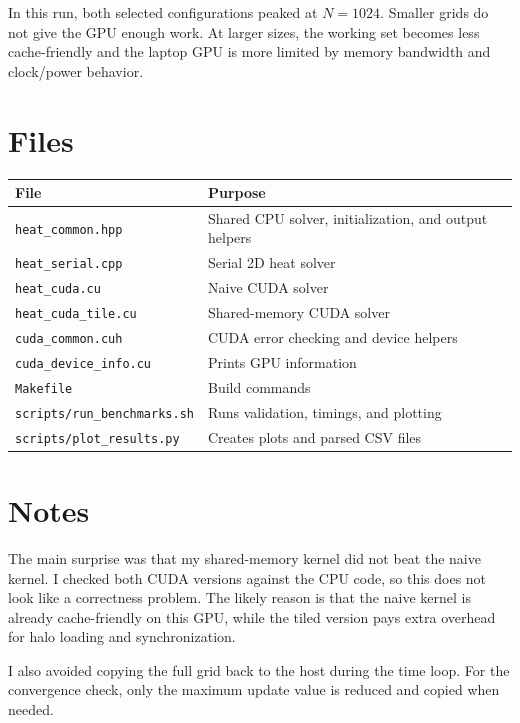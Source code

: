 \documentclass[11pt]{article}
\begin{document}
In this run, both selected configurations peaked at \(N=1024\). Smaller grids
do not give the GPU enough work. At larger sizes, the working set becomes less
cache-friendly and the laptop GPU is more limited by memory bandwidth and
clock/power behavior.

\section{Files}

\begin{center}
\begin{tabular}{ll}
\toprule
File & Purpose \\
\midrule
\texttt{heat\_common.hpp} & Shared CPU solver, initialization, and output helpers \\
\texttt{heat\_serial.cpp} & Serial 2D heat solver \\
\texttt{heat\_cuda.cu} & Naive CUDA solver \\
\texttt{heat\_cuda\_tile.cu} & Shared-memory CUDA solver \\
\texttt{cuda\_common.cuh} & CUDA error checking and device helpers \\
\texttt{cuda\_device\_info.cu} & Prints GPU information \\
\texttt{Makefile} & Build commands \\
\texttt{scripts/run\_benchmarks.sh} & Runs validation, timings, and plotting \\
\texttt{scripts/plot\_results.py} & Creates plots and parsed CSV files \\
\bottomrule
\end{tabular}
\end{center}

\section{Notes}

The main surprise was that my shared-memory kernel did not beat the naive
kernel. I checked both CUDA versions against the CPU code, so this does not
look like a correctness problem. The likely reason is that the naive kernel is
already cache-friendly on this GPU, while the tiled version pays extra overhead
for halo loading and synchronization.

I also avoided copying the full grid back to the host during the time loop. For
the convergence check, only the maximum update value is reduced and copied when
needed.
\end{document}
